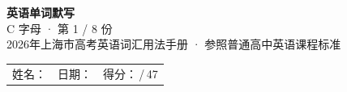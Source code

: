 \documentclass[10pt,a4paper]{article}
\begin{document}
\pagestyle{plain}

\begin{center}
{\LARGE\bfseries 英语单词默写}\\[0.22em]
{\large C 字母 · 第 1 / 8 份}\\[0.18em]
{\small 2026年上海市高考英语词汇用法手册 · 参照普通高中英语课程标准}
\end{center}

\vspace{0.25em}
\noindent\begin{tabular}{@{}p{}@{}p{}@{}p{}@{}}
姓名：\underline{\hspace{2.0cm}} & 日期：\underline{\hspace{2.0cm}} & 得分：\underline{\hspace{1.3cm}}\,/\,47 \\
\end{tabular}

\vspace{0.3em}

\vspace{0.08em}
\end{document}
